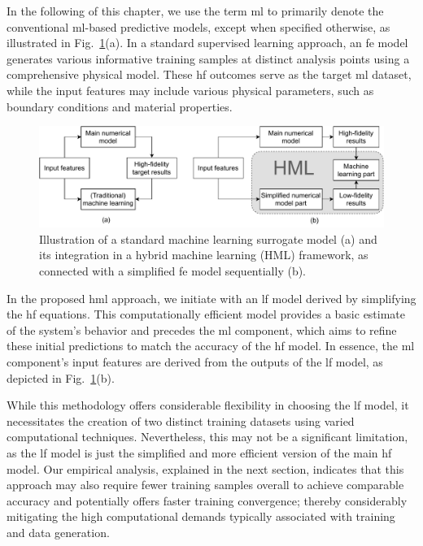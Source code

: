 In the following of this chapter, we use the term \ac{ml} to primarily denote the conventional \ac{ml}-based predictive models, except when specified otherwise, as illustrated in Fig.~\ref{fig:ml_system}(a). In a standard supervised learning approach, an \ac{fe} model generates various informative training samples at distinct analysis points using a comprehensive physical model. These \ac{hf} outcomes serve as the target \ac{ml} dataset, while the input features may include various physical parameters, such as boundary conditions and material properties.
%
\begin{figure}[H]\centering
\includegraphics[width=\textwidth]{img/ML.pdf}
\caption{Illustration of a standard machine learning surrogate model (a) and its integration in a hybrid machine learning (HML) framework, as connected with a simplified \ac{fe} model sequentially (b).
\label{fig:ml_system}}
\end{figure}

In the proposed \ac{hml} approach, we initiate with an \ac{lf} model derived by simplifying the \ac{hf} equations. This computationally efficient model provides a basic estimate of the system's behavior and precedes the \ac{ml} component, which aims to refine these initial predictions to match the accuracy of the \ac{hf} model. In essence, the \ac{ml} component's input features are derived from the outputs of the \ac{lf} model, as depicted in Fig.~\ref{fig:ml_system}(b).

While this methodology offers considerable flexibility in choosing the \ac{lf} model, it necessitates the creation of two distinct training datasets using varied computational techniques. Nevertheless, this may not be a significant limitation, as the \ac{lf} model is just the simplified and more efficient version of the main \ac{hf} model. Our empirical analysis, explained in the next section, indicates that this approach may also require fewer training samples overall to achieve comparable accuracy and potentially offers faster training convergence; thereby considerably mitigating the high computational demands typically associated with training and data generation.

